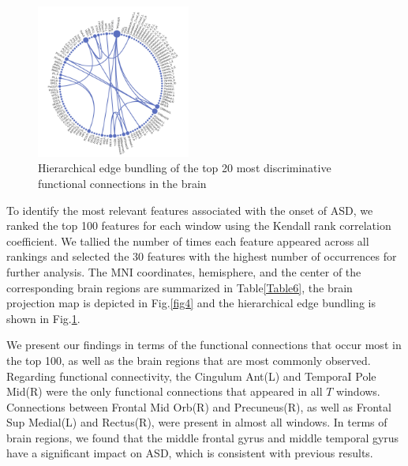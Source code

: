 \documentclass[journal,twoside,web]{ieeecolor}
\begin{document}
\begin{figure}[h]
	\centering
	\includegraphics[width=0.45\textwidth]{imgs/circus.jpg}
	\caption{Hierarchical edge bundling of the top 20 most discriminative functional connections in the brain}
	\label{fig5}
\end{figure} 


To identify the most relevant features associated with the onset of ASD, we ranked the top 100 features for each window using the Kendall rank correlation coefficient. We tallied the number of times each feature appeared across all rankings and selected the 30 features with the highest number of occurrences for further analysis. The MNI coordinates, hemisphere, and the center of the corresponding brain regions are summarized in Table\ref{Table6}, the brain projection map is depicted in Fig.\ref{fig4} and the hierarchical edge bundling is shown in Fig.\ref{fig5}.

We present our findings in terms of the functional connections that occur most in the top 100, as well as the brain regions that are most commonly observed.  Regarding functional connectivity, the Cingulum Ant(L) and TemporaI Pole Mid(R) were the only functional connections that appeared in all $T$ windows. Connections between Frontal Mid Orb(R) and Precuneus(R), as well as Frontal Sup Medial(L) and Rectus(R), were present in almost all windows. In terms of brain regions, we found that the middle frontal gyrus and middle temporal gyrus have a significant impact on ASD, which is consistent with previous results\cite{wang2021autistic, monk2009abnormalities, xu2020specific, foti2019observational}.
\end{document}
